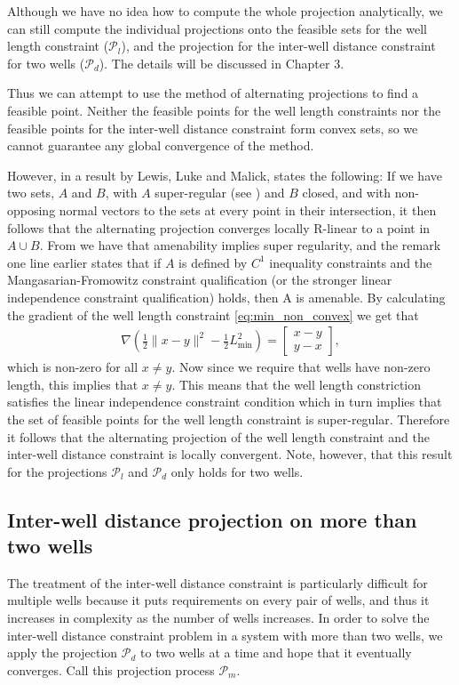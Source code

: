 Although we have no idea how to compute the whole projection analytically, 
we can still compute the individual projections onto the feasible sets for 
the well length constraint ($\mathcal{P}_{l}$), and the projection for the inter-well 
distance constraint for two wells ($\mathcal{P}_{d}$). The details will be
discussed in Chapter 3.

Thus we can attempt to use
the method of alternating projections to find a feasible point.
%
Neither the feasible points for the well length constraints 
nor the feasible points for the inter-well distance constraint 
form convex sets, so we cannot guarantee any global convergence of
the method.

However, in a result\cite{Lewis_Luke_Malick} by Lewis, Luke and Malick,
\cite[Thm. 5.16]{Lewis_Luke_Malick} states the following: If we have two sets,
$A$ and $B$, with $A$ super-regular (see \cite[Def. 4.3]{Lewis_Luke_Malick}) 
and $B$ closed, and with non-opposing normal vectors to the sets at every point
in their intersection, it then follows that the alternating projection converges
locally R-linear to a point in $A \cup B$.
%
From \cite[Proposition 4.8]{Lewis_Luke_Malick} we have that amenability implies super regularity, and
the remark one line earlier states that if $A$ is defined by $C^1$ inequality 
constraints and the Mangasarian-Fromowitz constraint qualification \cite[Def. 12.6]{Nocedal_Wright} 
(or the stronger linear independence constraint qualification) holds, then A is amenable.
%
By calculating the gradient of the well length constraint \eqref{eq:min_non_convex}
we get that
%
\begin{align}
\nabla \left( \frac{1}{2} \| x - y \|^2 - \frac{1}{2}L_{\min}^2 \right) = \begin{bmatrix} x-y \\y-x \end{bmatrix},
\end{align}
%
which is non-zero for all $x \neq y$. Now since we require that wells have non-zero
length, this implies that $x \neq y$. This means that the well length constriction
satisfies the linear independence constraint condition which in turn implies that
the set of feasible points for the well length constraint is super-regular.
%
Therefore it follows that the alternating projection of the well length constraint
and the inter-well distance constraint is locally convergent. Note, however, that 
this result for the projections $\mathcal{P}_{l}$ and $\mathcal{P}_{d}$ only
holds for two wells.
%
\subsection{Inter-well distance projection on more than two wells}
%
The treatment of the inter-well distance constraint is particularly
difficult for multiple wells because it puts requirements on every 
pair of wells, and thus it increases in complexity as the number of 
wells increases.
%
In order to solve the inter-well distance constraint problem in a
system with more than two wells, we apply the projection $\mathcal{P}_{d}$
to two wells at a time and hope that it eventually converges. Call this
projection process $\mathcal{P}_{m}$.
%
